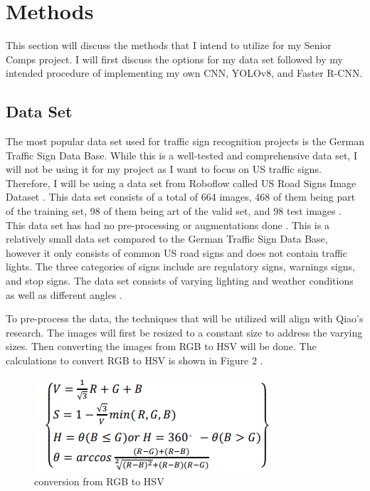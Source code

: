 \documentclass[10pt,twocolumn]{article}
\begin{document}
\section{Methods}
This section will discuss the methods that I intend to utilize for my Senior Comps project. I will first discuss the options for my data set followed by my intended procedure of implementing my own CNN, YOLOv8, and Faster R-CNN. 

\subsection{Data Set}
The most popular data set used for traffic sign recognition projects is the German Traffic Sign Data Base. While this is a well-tested and comprehensive data set, I will not be using it for my project as I want to focus on US traffic signs. Therefore, I will be using a data set from Roboflow called US Road Signs Image Dataset \textcite{dataSet}. This data set consists of a total of 664 images, 468 of them being part of the training set, 98 of them being art of the valid set, and 98 test images \textcite{dataSet}. This data set has had no pre-processing or augmentations done \textcite{dataSet}. This is a relatively small data set compared to the German Traffic Sign Data Base, however it only consists of common US road signs and does not contain traffic lights. The three categories of signs include are regulatory signs, warnings signs, and stop signs. The data set consists of varying lighting and weather conditions as well as different angles \textcite{dataSet}. 

To pre-process the data, the techniques that will be utilized will align with Qiao's research. The images will first be resized to a constant size to address the varying sizes. Then converting the images from RGB to HSV will be done. The calculations to convert  RGB to HSV is shown in Figure 2 \textcite{HSV}. 

\begin{figure}[h]
    \centering
    \includegraphics[width=.95\linewidth]{conv.png}    \caption{
        conversion from RGB to HSV \textcite{HSV}
    }
    \label{fig:first-page}
\end{figure}
\end{document}
